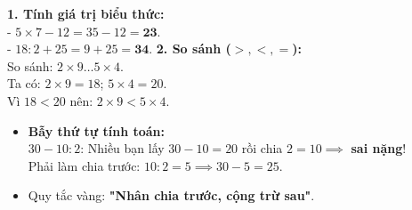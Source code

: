 \documentclass[11pt,a4paper]{article}
\begin{document}
\vspace{-1.5mm}
\noindent
\begin{minipage}[t]{0.49\textwidth}\vspace{0pt}
\begin{tcolorbox}[
  enhanced,
  colback=green!4!white,
  colframe=green!60!black,
  arc=2mm, boxrule=0.8pt,
  left=2mm, right=2mm, top=1.8mm, bottom=1.8mm,
  title={\footnotesize\bfseries\color{white}\faCheckCircle\ 4. Ví dụ thực hành chuẩn mực}
]
{\footnotesize
\textbf{1. Tính giá trị biểu thức:}\\
- $5 \times 7 - 12 = 35 - 12 = \mathbf{23}$.\\
- $18 : 2 + 25 = 9 + 25 = \mathbf{34}$.
\textbf{2. So sánh ($>, <, =$):}\\
So sánh: $2 \times 9 \dots 5 \times 4$.\\
Ta có: $2 \times 9 = 18$; $5 \times 4 = 20$.\\
Vì $18 < 20$ nên: $2 \times 9 < 5 \times 4$.
}
\end{tcolorbox}
\end{minipage}
\hfill
\begin{minipage}[t]{0.49\textwidth}\vspace{0pt}
\begin{tcolorbox}[
  enhanced,
  colback=red!4!white,
  colframe=red!75!black,
  arc=2mm, boxrule=0.8pt,
  left=2mm, right=2mm, top=1.8mm, bottom=1.8mm,
  title={\footnotesize\bfseries\color{white}\faExclamationTriangle\ 5. Mẹo tránh bẫy trắc nghiệm}
]
{\footnotesize
\begin{itemize}\setlength{\itemsep}{1pt}\setlength{\leftskip}{-2.5mm}
  \item \textbf{Bẫy thứ tự tính toán:}\\
  $30 - 10 : 2$: Nhiều bạn lấy $30 - 10 = 20$ rồi chia $2 = 10 \implies$ \textbf{sai nặng}!\\
  Phải làm chia trước: $10 : 2 = 5 \implies 30 - 5 = 25$.
  \item Quy tắc vàng: \textbf{"Nhân chia trước, cộng trừ sau"}.
\end{itemize}
}
\end{tcolorbox}
\end{minipage}
\end{document}
